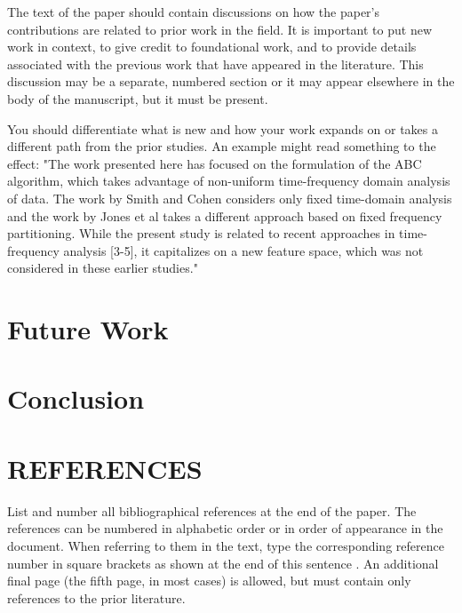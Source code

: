 \documentclass{article}
\begin{document}
The text of the paper should contain discussions on how the paper's
contributions are related to prior work in the field. It is important
to put new work in  context, to give credit to foundational work, and
to provide details associated with the previous work that have appeared
in the literature. This discussion may be a separate, numbered section
or it may appear elsewhere in the body of the manuscript, but it must
be present.

You should differentiate what is new and how your work expands on
or takes a different path from the prior studies. An example might
read something to the effect: "The work presented here has focused
on the formulation of the ABC algorithm, which takes advantage of
non-uniform time-frequency domain analysis of data. The work by
Smith and Cohen considers only fixed time-domain analysis and
the work by Jones et al takes a different approach based on
fixed frequency partitioning. While the present study is related
to recent approaches in time-frequency analysis [3-5], it capitalizes
on a new feature space, which was not considered in these earlier
studies."


\section{Future Work}
\label{sec:future}

\section{Conclusion}
\label{sec:future}

\vfill\pagebreak

\section{REFERENCES}
\label{sec:refs}

List and number all bibliographical references at the end of the
paper. The references can be numbered in alphabetic order or in
order of appearance in the document. When referring to them in
the text, type the corresponding reference number in square
brackets as shown at the end of this sentence . An
additional final page (the fifth page, in most cases) is
allowed, but must contain only references to the prior
literature.

\end{document}
